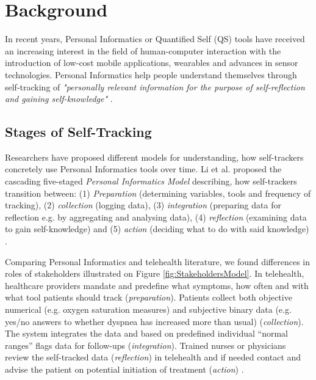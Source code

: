 \section{Background} 
In recent years, Personal Informatics or Quantified Self (QS) tools have received an increasing interest in the field of human-computer interaction with the introduction of low-cost mobile applications, wearables and advances in sensor technologies. Personal Informatics help people understand themselves through self-tracking of \textit{"personally relevant information for the purpose of self-reflection and gaining self-knowledge"} \cite{Li2010}. 

\subsection{Stages of Self-Tracking}
Researchers have proposed different models for understanding, how self-trackers concretely use Personal Informatics tools over time. Li et al. proposed the cascading five-staged \textit{Personal Informatics Model} describing, how self-trackers transition between: (1) \textit{Preparation} (determining variables, tools and frequency of tracking), (2) \textit{collection} (logging data), (3) \textit{integration} (preparing data for reflection e.g. by aggregating and analysing data), (4) \textit{reflection} (examining data to gain self-knowledge) and (5) \textit{action} (deciding what to do with said knowledge) \cite{Li2010}. 

Comparing Personal Informatics and telehealth literature, we found differences in roles of stakeholders illustrated on Figure \ref{fig:StakeholdersModel}. In telehealth, healthcare providers mandate and predefine what symptoms, how often and with what tool patients should track (\textit{preparation}). Patients collect both objective numerical (e.g. oxygen saturation measures) and subjective binary data (e.g. yes/no answers to whether dyspnea has increased more than usual) (\textit{collection}). The system integrates the data and based on predefined individual “normal ranges” flags data for follow-ups (\textit{integration}). Trained nurses or physicians review the self-tracked data (\textit{reflection}) in telehealth and if needed contact and advise the patient on potential initiation of treatment (\textit{action}) \cite{piloting, pedone}. 

